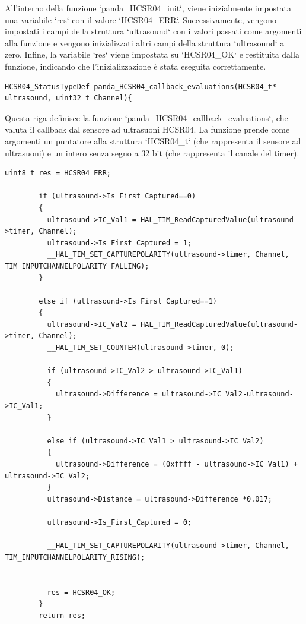 \documentclass{article}
\begin{document}
      All'interno della funzione `panda\_HCSR04\_init`, viene inizialmente impostata una variabile `res` con il valore `HCSR04\_ERR`. Successivamente, vengono impostati i campi della struttura `ultrasound` con i valori passati come argomenti alla funzione e vengono inizializzati altri campi della struttura `ultrasound` a zero. Infine, la variabile `res` viene impostata su `HCSR04\_OK` e restituita dalla funzione, indicando che l'inizializzazione è stata eseguita correttamente.
      
      \begin{lstlisting}[style=CStyle]
      HCSR04_StatusTypeDef panda_HCSR04_callback_evaluations(HCSR04_t* ultrasound, uint32_t Channel){
      \end{lstlisting}
      
      Questa riga definisce la funzione `panda\_HCSR04\_callback\_evaluations`, che valuta il callback dal sensore ad ultrasuoni HCSR04. La funzione prende come argomenti un puntatore alla struttura `HCSR04\_t` (che rappresenta il sensore ad ultrasuoni) e un intero senza segno a 32 bit (che rappresenta il canale del timer).
      
      \begin{lstlisting}[style=CStyle]
        uint8_t res = HCSR04_ERR;
      
        if (ultrasound->Is_First_Captured==0)
        {
          ultrasound->IC_Val1 = HAL_TIM_ReadCapturedValue(ultrasound->timer, Channel);
          ultrasound->Is_First_Captured = 1;
          __HAL_TIM_SET_CAPTUREPOLARITY(ultrasound->timer, Channel, TIM_INPUTCHANNELPOLARITY_FALLING);
        }
      
        else if (ultrasound->Is_First_Captured==1)
        {
          ultrasound->IC_Val2 = HAL_TIM_ReadCapturedValue(ultrasound->timer, Channel);
          __HAL_TIM_SET_COUNTER(ultrasound->timer, 0);
      
          if (ultrasound->IC_Val2 > ultrasound->IC_Val1)
          {
            ultrasound->Difference = ultrasound->IC_Val2-ultrasound->IC_Val1;
          }
      
          else if (ultrasound->IC_Val1 > ultrasound->IC_Val2)
          {
            ultrasound->Difference = (0xffff - ultrasound->IC_Val1) + ultrasound->IC_Val2;
          }
          ultrasound->Distance = ultrasound->Difference *0.017;
      
          ultrasound->Is_First_Captured = 0;
      
          __HAL_TIM_SET_CAPTUREPOLARITY(ultrasound->timer, Channel, TIM_INPUTCHANNELPOLARITY_RISING);
      
      
          res = HCSR04_OK;
        }
        return res;
      \end{lstlisting}
      
\end{document}
